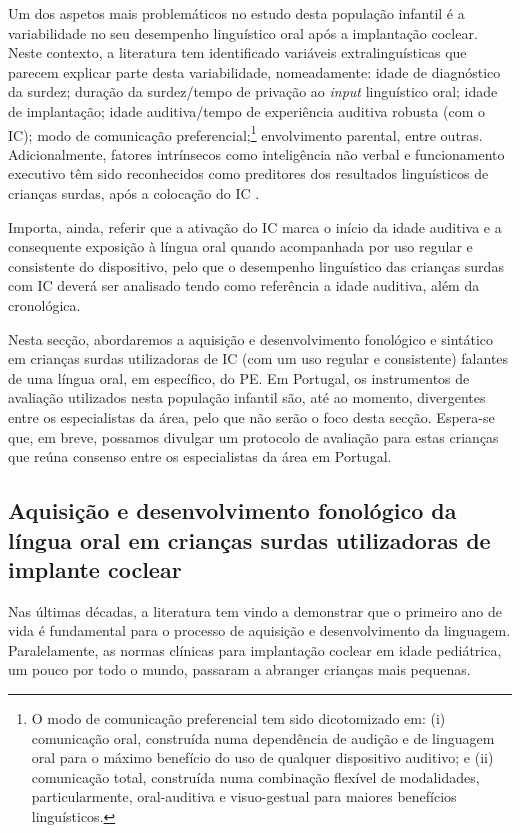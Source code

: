 \documentclass[output=paper,colorlinks,citecolor=brown,booklanguage=portuguese]{langscibook}
\begin{document}
Um dos aspetos mais problemáticos no estudo desta população infantil é a variabilidade no seu desempenho linguístico oral após a implantação coclear. Neste contexto, a literatura tem identificado variáveis extralinguísticas que parecem explicar parte desta variabilidade, nomeadamente: idade de diagnóstico da surdez; duração da surdez/tempo de privação ao \emph{input} linguístico oral; idade de implantação; idade auditiva/tempo de experiência auditiva robusta (com o IC); modo de comunicação preferencial;\footnote{O modo de comunicação preferencial tem sido dicotomizado em: (i) comunicação oral, construída numa dependência de audição e de linguagem oral para o máximo benefício do uso de qualquer dispositivo auditivo; e (ii) comunicação total, construída numa combinação flexível de modalidades, particularmente, oral-auditiva e visuo-gestual para maiores benefícios linguísticos.} envolvimento parental, entre outras. Adicionalmente, fatores intrínsecos como inteligência não verbal e funcionamento executivo têm sido reconhecidos como preditores dos resultados linguísticos de crianças surdas, após a colocação do IC \citep{Beer2014, Dawson2002}.

Importa, ainda, referir que a ativação do IC marca o início da idade auditiva e a consequente exposição à língua oral quando acompanhada por uso regular e consistente do dispositivo, pelo que o desempenho linguístico das crianças surdas com IC deverá ser analisado tendo como referência a idade auditiva, além da cronológica.

Nesta secção, abordaremos a aquisição e desenvolvimento fonológico e sintático em crianças surdas utilizadoras de IC (com um uso regular e consistente) falantes de uma língua oral, em específico, do PE. Em Portugal, os instrumentos de avaliação utilizados nesta população infantil são, até ao momento, divergentes entre os especialistas da área, pelo que não serão o foco desta secção. Espera-se que, em breve, possamos divulgar um protocolo de avaliação para estas crianças que reúna consenso entre os especialistas da área em Portugal.

\subsection{Aquisição e desenvolvimento fonológico da língua oral em crianças surdas utilizadoras de implante coclear}

Nas últimas décadas, a literatura tem vindo a demonstrar que o primeiro ano de vida é fundamental para o processo de aquisição e desenvolvimento da linguagem. Paralelamente, as normas clínicas para implantação coclear em idade pediátrica, um pouco por todo o mundo, passaram a abranger crianças mais pequenas. 
\end{document}
